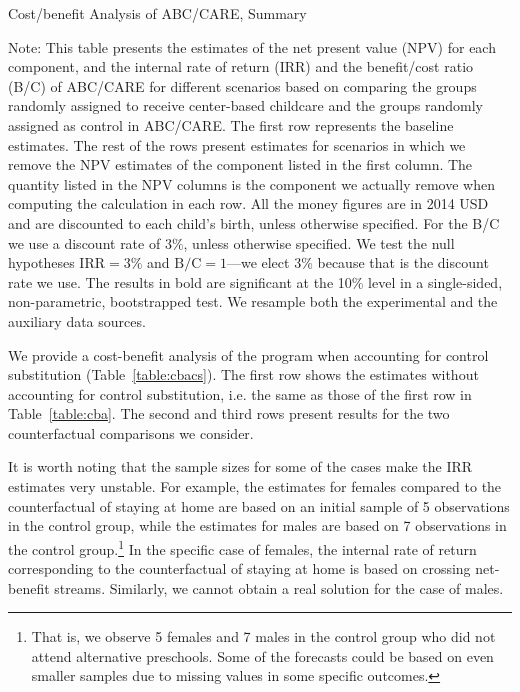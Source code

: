 \begin{table}
\centering
\begin{threeparttable}
\caption{Cost/benefit Analysis of ABC/CARE, Summary}
\label{table:cba}
\centerline{
	\scalebox{0.85}{
		
	}
}
\begin{tablenotes}
\item Note: This table presents the estimates of the net present value (NPV) for each component, and the internal rate of return (IRR) and the benefit/cost ratio (B/C) of ABC/CARE for different scenarios based on comparing the groups randomly assigned to receive center-based childcare and the groups randomly assigned as control in ABC/CARE. The first row represents the baseline estimates. The rest of the rows present estimates for scenarios in which we remove the NPV estimates of the component listed in the first column. The quantity listed in the NPV columns is the component we actually remove when computing the calculation in each row. All the money figures are in 2014 USD and are discounted to each child's birth, unless otherwise specified. For the B/C we use a discount rate of $3\%$, unless otherwise specified. We test the null hypotheses $\text{IRR} = 3\%$ and $\text{B/C} = 1$---we elect $3\%$ because that is the discount rate we use. The results in bold are significant at the 10\% level in a single-sided, non-parametric, bootstrapped test. We resample both the experimental and the auxiliary data sources.
\end{tablenotes}
\end{threeparttable}
\end{table}

We provide a cost-benefit analysis of the program when accounting for control substitution (Table~\ref{table:cbacs}). The first row shows the estimates without accounting for control substitution, i.e. the same as those of the first row in Table~\ref{table:cba}. The second and third rows present results for the two counterfactual comparisons we consider.

It is worth noting that the sample sizes for some of the cases make the IRR estimates very unstable. For example, the estimates for females compared to the counterfactual of staying at home are based on an initial sample of 5 observations in the control group, while the estimates for males are based on 7  observations in the control group.\footnote{That is, we observe 5 females and 7 males in the control group who did not attend alternative preschools. Some of the forecasts could be based on even smaller samples due to missing values in some specific outcomes.} In the specific case of females, the internal rate of return corresponding to the counterfactual of staying at home is based on crossing net-benefit streams. Similarly, we cannot obtain a real solution for the case of males.

